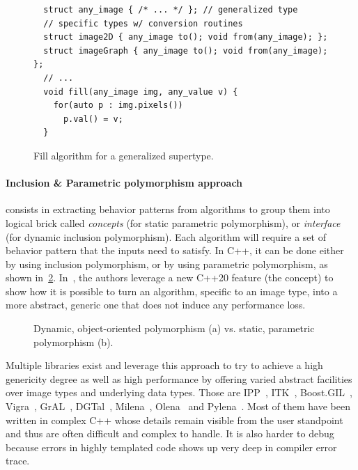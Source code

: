 \begin{figure}[tbh]
  \centering
  \begin{verbatim}
  struct any_image { /* ... */ }; // generalized type
  // specific types w/ conversion routines
  struct image2D { any_image to(); void from(any_image); };
  struct imageGraph { any_image to(); void from(any_image); };
  // ...
  void fill(any_image img, any_value v) {
    for(auto p : img.pixels())
      p.val() = v;
  }
  \end{verbatim}
  \caption{Fill algorithm for a generalized supertype.}
  \label{code:gen.generalized}
\end{figure}

\paragraph{Inclusion \& Parametric polymorphism approach} consists in extracting behavior patterns from algorithms to
group them into logical brick called \emph{concepts} (for static parametric polymorphism), or \emph{interface} (for
dynamic inclusion polymorphism). Each algorithm will require a set of behavior pattern that the inputs need to satisfy.
In C++, it can be done either by using inclusion polymorphism, or by using parametric polymorphism, as shown
in~\ref{code:gen.inclupoly}. In~\cite{roynard.2019.rrpr}, the authors leverage a new C++20 feature (the concept) to show
how it is possible to turn an algorithm, specific to an image type, into a more abstract, generic one that does not
induce any performance loss.

\begin{figure}[htb]
  \centering
  \hfil
  \vfil
  \hfil
  \caption{Dynamic, object-oriented polymorphism (a) vs. static, parametric polymorphism (b).}
  \label{code:gen.inclupoly}
\end{figure}

Multiple libraries exist and leverage this approach to try to achieve a high genericity degree as well as high
performance by offering varied abstract facilities over image types and underlying data types. Those are
IPP~\cite{taylor.2004.intel}, ITK~\cite{johnson.2013.ITKSoftwareGuideThirdEdition}, Boost.GIL~\cite{bourdev.2006.bgil},
Vigra~\cite{kothe.2011.generic}, GrAL~\cite{berti.2006.gral}, DGTal~\cite{coeurjolly.2016.dgtal},
Milena~\cite{levillain.2009.ismm,levillain.2010.icip},
Olena~\cite{olena.2000.www,levillain.2011.phd,geraud.2012.hdr,levillain.2014.ciarp} and
Pylena~\cite{carlinet.2018.pylena}. Most of them have been written in complex C++ whose details remain visible from the
user standpoint and thus are often difficult and complex to handle. It is also harder to debug because errors in highly
templated code shows up very deep in compiler error trace.

